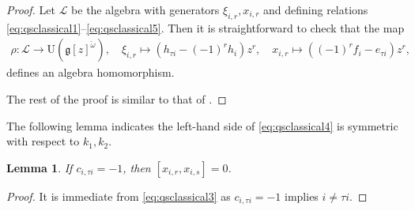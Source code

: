 \documentclass[11pt,reqno]{amsart}
\numberwithin{equation}{section}
\newtheorem{lem}[thm]{Lemma}
\theoremstyle{definition}
\theoremstyle{remark}
\newcommand{\g}{\mathfrak{g}}
\newcommand{\rU}{{\mathrm{U}}}
\begin{document}
\begin{proof}
Let $\mathscr L$ be the algebra with generators $\xi_{i,r},x_{i,r}$ and defining relations \eqref{eq:qsclassical1}--\eqref{eq:qsclassical5}. Then it is straightforward to check that the map
\begin{align*}
\rho:\mathscr L\to \rU(\g[z]^{\check \omega}),\quad 
\xi_{i,r}\mapsto (h_{\tau i}-(-1)^rh_i)z^r,\quad x_{i,r}\mapsto ((-1)^rf_i-e_{\tau i})z^r,
\end{align*}
defines an algebra homomorphism. 

The rest of the proof is similar to that of \cite[Prop.~2.5]{KLWZ23b}.
\end{proof}

The following lemma indicates the left-hand side of \eqref{eq:qsclassical4} is symmetric with respect to $k_1,k_2$.
\begin{lem}\label{lem:com-1}
If $c_{i,\tau i}=-1$, then $[x_{i,r},x_{i,s}]=0$.
\end{lem}
\begin{proof}
It is immediate from \eqref{eq:qsclassical3} as $c_{i,\tau i}=-1$ implies $i\ne \tau i$.
\end{proof}
\end{document}
